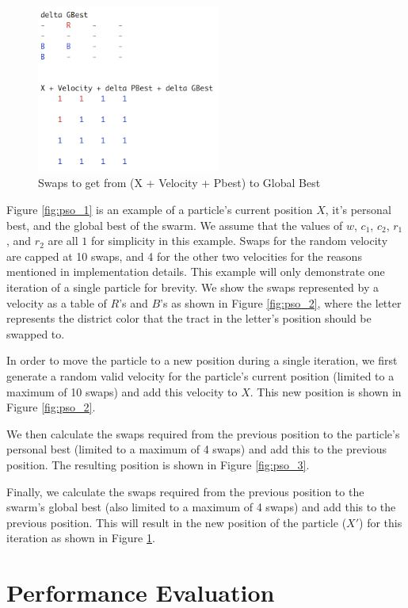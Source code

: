 \documentclass[journal]{IEEEtran}
\begin{document}
\begin{figure}[h!]
    \includegraphics[width=6cm]{pso4.png}
    \centering
    \caption{Swaps to get from (X + Velocity + Pbest) to Global Best}
        \label{fig:pso_4}
\end{figure}

Figure \ref{fig:pso_1} is an example of a particle's current position $X$, it's personal best, and the global best of the swarm. We assume that the values of $w$, $c_1$, $c_2$, $r_1$, and $r_2$ are all $1$ for simplicity in this example. Swaps for the random velocity are capped at 10 swaps, and 4 for the other two velocities for the reasons mentioned in implementation details. This example will only demonstrate one iteration of a single particle for brevity. We show the swaps represented by a velocity as a table of $R$'s and $B$'s as shown in Figure \ref{fig:pso_2}, where the letter represents the district color that the tract in the letter's position should be swapped to.

In order to move the particle to a new position during a single iteration, we first generate a random valid velocity for the particle's current position (limited to a maximum of 10 swaps) and add this velocity to $X$. This new position is shown in Figure \ref{fig:pso_2}.

We then calculate the swaps required from the previous position to the particle's personal best (limited to a maximum of 4 swaps) and add this to the previous position. The resulting position is shown in Figure \ref{fig:pso_3}.

Finally, we calculate the swaps required from the previous position to the swarm's global best (also limited to a maximum of 4 swaps) and add this to the previous position. This will result in the new position of the particle ($X'$) for this iteration as shown in Figure \ref{fig:pso_4}.


\section{Performance Evaluation}
\end{document}

